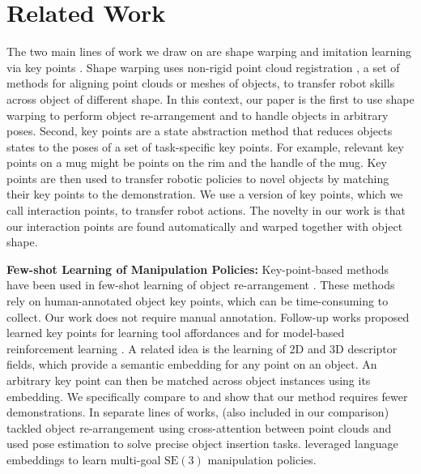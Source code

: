 \documentclass{article}
\begin{document}
\section{Related Work}

The two main lines of work we draw on are shape warping \cite{rodriguez18transferring,thompson21shapebased} and imitation learning via key points \cite{manuelli19kpam}. Shape warping uses non-rigid point cloud registration \cite{huang21comprehensive}, a set of methods for aligning point clouds or meshes of objects, to transfer robot skills across object of different shape. In this context, our paper is the first to use shape warping to perform object re-arrangement and to handle objects in arbitrary poses. Second, key points are a state abstraction method that reduces objects states to the poses of a set of task-specific key points. For example, relevant key points on a mug might be points on the rim and the handle of the mug. Key points are then used to transfer robotic policies to novel objects by matching their key points to the demonstration. We use a version of key points, which we call interaction points, to transfer robot actions. The novelty in our work is that our interaction points are found automatically and warped together with object shape.

\textbf{Few-shot Learning of Manipulation Policies:} Key-point-based methods have been used in few-shot learning of object re-arrangement \cite{manuelli19kpam,gao21kpam,gao21kpamsc}. These methods rely on human-annotated object key points, which can be time-consuming to collect. Our work does not require manual annotation. Follow-up works proposed learned key points for learning tool affordances \cite{qin20keto,vecerik20s3k,turpin21gift} and for model-based reinforcement learning \cite{manuelli20keypoints}. A related idea is the learning of 2D \cite{florence18dense} and 3D \cite{simeonov22neural,simeonov22se,ryu22equivariant,chun23local} descriptor fields, which provide a semantic embedding for any point on an object. An arbitrary key point can then be matched across object instances using its embedding. We specifically compare to \citet{simeonov22neural,simeonov22se} and show that our method requires fewer demonstrations. In separate lines of works, \citet{pan22taxpose} (also included in our comparison) tackled object re-arrangement using cross-attention \cite{vaswani17attention} between point clouds and \citet{wen22you} used pose estimation to solve precise object insertion tasks. \citet{shridhar22perceiveractor} leveraged language embeddings to learn multi-goal $\mathrm{SE}(3)$ manipulation policies.
\end{document}
